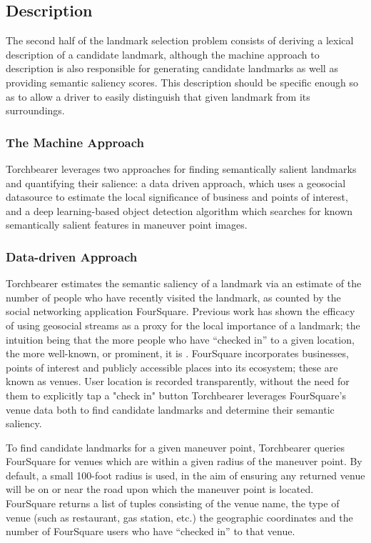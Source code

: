 \subsection{Description}
The second half of the landmark selection problem consists of deriving a lexical description of a candidate landmark, although the machine approach to description is also responsible for generating candidate landmarks as well as providing semantic saliency scores. This description should be specific enough so as to allow a driver to easily distinguish that given landmark from its surroundings.

\subsubsection{The Machine Approach}
Torchbearer leverages two approaches for finding semantically salient landmarks and quantifying their salience: a data driven approach, which uses a geosocial datasource to estimate the local significance of business and points of interest, and a deep learning-based object detection algorithm which searches for known semantically salient features in maneuver point images.
	
\subsubsection{Data-driven Approach}
Torchbearer estimates the semantic saliency of a landmark via an estimate of the number of people who have recently visited the landmark, as counted by the social networking application FourSquare. Previous work has shown the efficacy of using geosocial streams as a proxy for the local importance of a landmark; the intuition being that the more people who have “checked in” to a given location, the more well-known, or prominent, it is \cite{quesnot2014measure}. FourSquare incorporates businesses, points of interest and publicly accessible places into its ecosystem; these are known as venues. User location is recorded transparently, without the need for them to explicitly tap a "check in" button Torchbearer leverages FourSquare’s venue data both to find candidate landmarks and determine their semantic saliency. 

To find candidate landmarks for a given maneuver point, Torchbearer queries FourSquare for venues which are within a given radius of the maneuver point. By default, a small 100-foot radius is used, in the aim of ensuring any returned venue will be on or near the road upon which the maneuver point is located. FourSquare returns a list of tuples consisting of the venue name, the type of venue (such as restaurant, gas station, etc.) the geographic coordinates and the number of FourSquare users who have “checked in” to that venue. 

